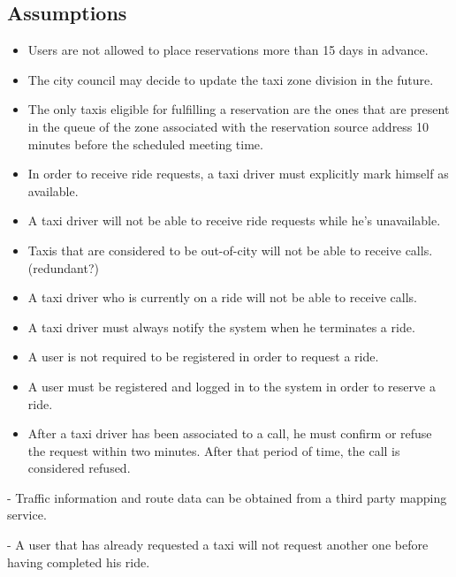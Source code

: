 \subsection{Assumptions}
\begin{itemize}
\item Users are not allowed to place reservations more than 15 days in advance. 
\item The city council may decide to update the taxi zone division in the future. 
\item The only taxis eligible for fulfilling a reservation are the ones that are present in the queue of the zone associated with the reservation source address 10 minutes before the scheduled meeting time.
\item In order to receive ride requests, a taxi driver must explicitly mark himself as available.
\item A taxi driver will not be able to receive ride requests while he’s unavailable.
\item Taxis that are considered to be out-of-city will not be able to receive calls. (redundant?)
\item A taxi driver who is currently on a ride will not be able to receive calls.
\item A taxi driver must always notify the system when he terminates a ride. 
\item A user is not required to be registered in order to request a ride.
\item A user must be registered and logged in to the system in order to reserve a ride.
\item After a taxi driver has been associated to a call, he must confirm or refuse the request within two minutes. After that period of time, the call is considered refused. 
\end{itemize}

- Traffic information and route data can be obtained from a third party mapping service.

- A user that has already requested a taxi will not request another one before having completed his ride.